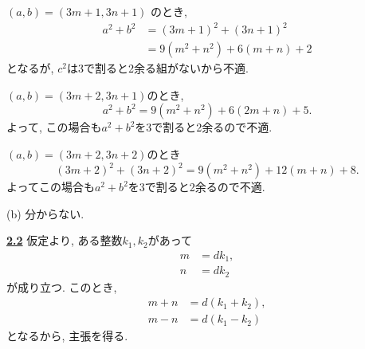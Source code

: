 \documentclass{jarticle}
\newcommand{\cnt}[1]{\noindent \underline{\textbf{#1}}}
\begin{document}
\noindent $(a, b) = (3m+1, 3n+1)$ のとき,
\begin{align*}
a^2 + b^2
  &= (3m+1)^2 + (3n+1)^2 \\
  &= 9(m^2 + n^2) + 6(m+n) + 2
\end{align*}
となるが, $c^2$は3で割ると2余る組がないから不適.

\noindent $(a, b) = (3m+2, 3n+1)$のとき,
\[
  a^2 + b^2 = 9(m^2 + n^2) + 6(2m + n) + 5.
\]
よって, この場合も$a^2 + b^2$を3で割ると2余るので不適.

\noindent $(a, b) = (3m+2, 3n+2)$のとき
\[
  (3m+2)^2 + (3n+2)^2 = 9(m^2 + n^2) + 12(m+n) + 8.
\]
よってこの場合も$a^2 + b^2$を3で割ると2余るので不適.

(b) 分からない.

\cnt{2.2} %
仮定より, ある整数$k_1, k_2$があって
\begin{align*}
  m &= dk_1, \\
  n &= dk_2
\end{align*}
が成り立つ.
このとき,
\begin{align*}
  m + n &= d(k_1 + k_2), \\
  m - n &= d(k_1 - k_2)
\end{align*}
となるから, 主張を得る.
\end{document}
